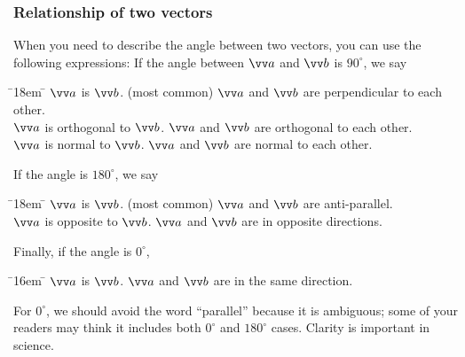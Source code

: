 \documentclass[11pt,pdfa,lastpage]{MishoNote}
\begin{document}
\subsubsection{Relationship of two vectors}
When you need to describe the angle between two vectors, you can use the following expressions:
If the angle between $\vc a$ and $\vc b$ is $90^\circ$, we say
\begin{tabbing}
  \fakebullet \= \kern18em \=\kill
\fakebullet \> $\vc a$ is  $\vc b$. {\footnotesize (most common)} \> \fakebullet $\vc a$ and $\vc b$ are perpendicular to each other.\\[\itemsep]
  \fakebullet \> $\vc a$ is orthogonal to $\vc b$.   \>    \fakebullet $\vc a$ and $\vc b$ are orthogonal  to each other.\\[\itemsep]
  \fakebullet \> $\vc a$ is normal to $\vc b$.       \>    \fakebullet $\vc a$ and $\vc b$ are normal to each other.
 \end{tabbing}
If the angle is $180^\circ$, we say
\begin{tabbing}
  \fakebullet \= \kern18em \=\kill
\fakebullet \> $\vc a$ is  $\vc b$. {\footnotesize (most common)} \> \fakebullet $\vc a$ and $\vc b$ are anti-parallel.\\[\itemsep]
  \fakebullet \> $\vc a$ is opposite to $\vc b$.      \> \fakebullet $\vc a$ and $\vc b$ are in opposite directions.
\end{tabbing}
Finally, if the angle is $0^\circ$,
\begin{tabbing}
  \fakebullet \= \kern16em \=\kill
  \fakebullet \> $\vc a$ is  $\vc b$. \> \fakebullet $\vc a$ and $\vc b$ are in the same direction.
\end{tabbing}
For $0^\circ$, we should avoid the word ``parallel'' because it is ambiguous; some of your readers may think it includes both $0^\circ$ and $180^\circ$ cases. Clarity is important in science.

\OutputNote
\end{document}
